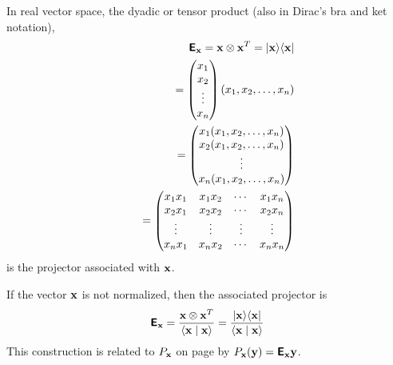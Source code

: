 In real vector space, the dyadic or tensor product
(also in Dirac's bra and ket notation),
\begin{equation}
\begin{split}
\textsf{\textbf{E}}_{\bf x} = {\bf x} \otimes {\bf x}^T = \vert{\bf x}\rangle \langle {\bf x}\vert
\\
\qquad
=
\begin{pmatrix}
x_1\\
x_2\\
\vdots \\
x_n
\end{pmatrix}
(x_1,x_2,\ldots ,x_n)\\
\qquad
=
\begin{pmatrix}
x_1(x_1,x_2,\ldots ,x_n)\\
x_2(x_1,x_2,\ldots ,x_n)\\
\vdots  \\
x_n(x_1,x_2,\ldots ,x_n)
\end{pmatrix}
\\
\qquad
=
\begin{pmatrix}
x_1x_1&x_1x_2& \cdots&x_1x_n\\
x_2x_1&x_2x_2& \cdots&x_2x_n\\
\vdots & \vdots & \vdots &\vdots \\
x_nx_1&x_nx_2& \cdots&x_nx_n
\end{pmatrix}
\end{split}
\end{equation}
is the projector
associated with ${\bf x}$.

If the vector ${\bf x}$ is not normalized,
then the associated projector is
\begin{equation}
\textsf{\textbf{E}}_{\bf x} = \frac{{\bf x} \otimes {\bf x}^T}{\langle {\bf x}\mid {\bf x}\rangle}
= \frac{\vert{\bf x}\rangle \langle {\bf x}\vert}{\langle {\bf x}\mid {\bf x}\rangle}
\end{equation}
This construction is related to
$P_{\bf x}$ on page \pageref{2011-m-gsp}
by $P_{\bf x}({\bf y})=\textsf{\textbf{E}}_{\bf x}{\bf y}$.

